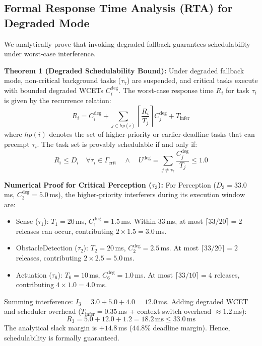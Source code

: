 \documentclass[10pt,conference]{IEEEtran}
\begin{document}
\subsection{Formal Response Time Analysis (RTA) for Degraded Mode}
We analytically prove that invoking degraded fallback guarantees schedulability under worst-case interference.

\textbf{Theorem 1 (Degraded Schedulability Bound):} Under degraded fallback mode, non-critical background tasks ($\tau_7$) are suspended, and critical tasks execute with bounded degraded WCETs $C_i^{\text{deg}}$. The worst-case response time $R_i$ for task $\tau_i$ is given by the recurrence relation:
\begin{equation}
    R_i = C_i^{\text{deg}} + \sum_{j \in hp(i)} \left\lceil \frac{R_i}{T_j} \right\rceil C_j^{\text{deg}} + T_{\text{infer}}
    \label{eq:rta}
\end{equation}
where $hp(i)$ denotes the set of higher-priority or earlier-deadline tasks that can preempt $\tau_i$. The task set is provably schedulable if and only if:
\begin{equation}
    R_i \le D_i \quad \forall \tau_i \in \Gamma_{\text{crit}} \quad \land \quad U^{\text{deg}} = \sum_{j \neq \tau_7} \frac{C_j^{\text{deg}}}{T_j} \le 1.0
\end{equation}

\textbf{Numerical Proof for Critical Perception ($\tau_3$):}
For Perception ($D_3 = 33.0$\,ms, $C_3^{\text{deg}} = 5.0$\,ms), the higher-priority interferers during its execution window are:
\begin{itemize}
    \item Sense ($\tau_1$): $T_1 = 20$\,ms, $C_1^{\text{deg}} = 1.5$\,ms. Within 33\,ms, at most $\lceil 33 / 20 \rceil = 2$ releases can occur, contributing $2 \times 1.5 = 3.0$\,ms.
    \item ObstacleDetection ($\tau_2$): $T_2 = 20$\,ms, $C_2^{\text{deg}} = 2.5$\,ms. At most $\lceil 33 / 20 \rceil = 2$ releases, contributing $2 \times 2.5 = 5.0$\,ms.
    \item Actuation ($\tau_6$): $T_6 = 10$\,ms, $C_6^{\text{deg}} = 1.0$\,ms. At most $\lceil 33 / 10 \rceil = 4$ releases, contributing $4 \times 1.0 = 4.0$\,ms.
\end{itemize}
Summing interference: $I_3 = 3.0 + 5.0 + 4.0 = 12.0$\,ms. Adding degraded WCET and scheduler overhead ($T_{\text{infer}} = 0.35$\,ms + context switch overhead $\approx 1.2$\,ms):
\begin{equation}
    R_3 = 5.0 + 12.0 + 1.2 = 18.2\,\text{ms} \le 33.0\,\text{ms}
\end{equation}
The analytical slack margin is $+14.8$\,ms ($44.8\%$ deadline margin). Hence, schedulability is formally guaranteed.
\end{document}
